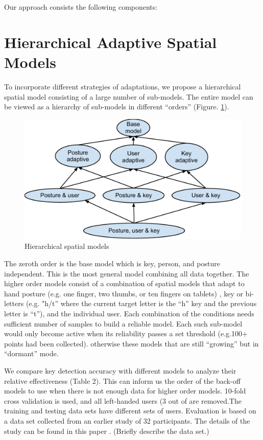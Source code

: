 \documentclass{sigchi}
\begin{document}
Our approach consists the following components:

\section{Hierarchical Adaptive Spatial Models}

To incorporate different strategies of adaptations, we propose a hierarchical
spatial model consisting of a large number of sub-models.
The entire model can be viewed as a hierarchy of sub-models in different
“orders” (Figure. \ref{fig:hierarchy}).

\begin{figure}[tb]
  \centering
  \includegraphics[width=1\columnwidth]{figures/hierarchical-spatial-model.pdf}
  \caption{Hierarchical spatial models}
  \label{fig:hierarchy}
\end{figure}

The zeroth order is the base model which is key, person, and posture
independent. This is the most general model combining all data together. The
higher order models consist of a combination of spatial models that adapt to hand posture (e.g. one finger, two thumbs, or ten fingers on tablets) , key or bi-letters (e.g. "h/t” where the current target letter is the “h” key and the previous letter is “t”), and the individual user. Each combination of the conditions needs sufficient number of samples to build a reliable model. Each such sub-model would only become active when its reliability passes a set threshold (e.g.100+ points had been collected). otherwise these models that are still “growing” but in “dormant” mode.

We compare key detection accuracy with different models to analyze their relative effectiveness (Table 2). This can inform us the order of the back-off models to use when there is not enough data for higher order models. 10-fold cross validation is used, and all left-handed users (3 out of are removed.The training and testing data sets have different sets of users.
Evaluation is based on a data set collected from an earlier study of 32
participants. The details of the study can be found in this paper \cite{}. 
(Briefly describe the data set.)
\end{document}
